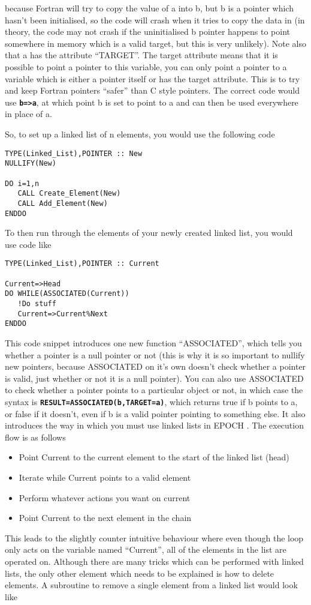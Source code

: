 \documentclass[12pt]{article}
\newcommand{\simpleboxverbatim}{\begin{Verbatim}[obeytabs=true,frame=single,
  framerule=0.5mm,rulecolor=\color{warwickmid}]}
\newcommand{\inlinecode}[1]{{\color{warwickred} \bf\texttt{#1}}}
\newcommand{\EPOCH}{{\color{warwickdark}\fontfamily{phv}\selectfont EPOCH} }
\begin{document}
because Fortran will try to copy the value of a into b, but b is a pointer
which hasn't been initialised, so the code will crash when it tries to copy
the data in (in theory, the code may not crash if the uninitialised b pointer
happens to point somewhere in memory which is a valid target, but this is very
unlikely). Note also that a has the attribute ``TARGET''. The target attribute
means that it is possible to point a pointer to this variable, you can only
point a pointer to a variable which is either a pointer itself or has the
target attribute. This is to try and keep Fortran pointers ``safer'' than C
style pointers. The correct code would use \inlinecode{b=>a}, at which point b
is set to point to a and can then be used everywhere in place of a.

So, to set up a linked list of n elements, you would use the following code

\simpleboxverbatim
TYPE(Linked_List),POINTER :: New
NULLIFY(New)

DO i=1,n
   CALL Create_Element(New)
   CALL Add_Element(New)
ENDDO
\end{Verbatim}

To then run through the elements of your newly created linked list, you would
use code like
\simpleboxverbatim
TYPE(Linked_List),POINTER :: Current

Current=>Head
DO WHILE(ASSOCIATED(Current))
   !Do stuff
   Current=>Current%
ENDDO
\end{Verbatim}

This code snippet introduces one new function ``ASSOCIATED'', which tells you
whether a pointer is a null pointer or not (this is why it is so important to
nullify new pointers, because ASSOCIATED on it's own doesn't check whether a
pointer is valid, just whether or not it is a null pointer). You can also use
ASSOCIATED to check whether a pointer points to a particular object or not, in
which case the syntax is \inlinecode{RESULT=ASSOCIATED(b,TARGET=a)}, which
returns true if b points to a, or false if it doesn't, even if b is a valid
pointer pointing to something else. It also introduces the way in which you
must use linked lists in \EPOCH. The execution flow is as follows
\begin{itemize}
\item Point Current to the current element to the start of the linked list
  (head)
\item Iterate while Current points to a valid element
\item Perform whatever actions you want on current
\item Point Current to the next element in the chain
\end{itemize}
This leads to the slightly counter intuitive behaviour where even though the
loop only acts on the variable named ``Current'', all of the elements in the
list are operated on. Although there are many tricks which can be performed
with linked lists, the only other element which needs to be explained is how
to delete elements. A subroutine to remove a single element from a linked list
would look like
\end{document}

